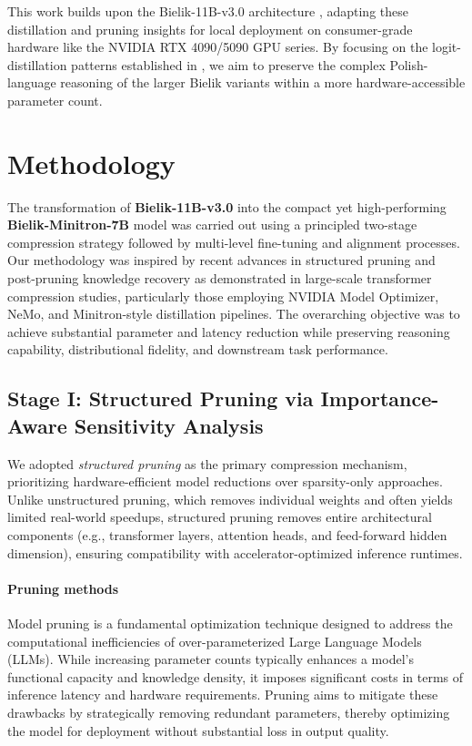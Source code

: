 \documentclass{article}
\begin{document}
This work builds upon the Bielik-11B-v3.0 architecture \cite{ociepa2025bielik11bv3multilingual,ociepa2025bielik11bv2technical,Ociepa_Flis_Wrobel_Gwozdziej_Kinas_2025}, adapting these distillation and pruning insights for local deployment on consumer-grade hardware like the NVIDIA RTX 4090/5090 GPU series. By focusing on the logit-distillation patterns established in \cite{nvidia-developer-blogpost}, we aim to preserve the complex Polish-language reasoning of the larger Bielik variants within a more hardware-accessible parameter count.

\section{Methodology}

The transformation of \textbf{Bielik-11B-v3.0} into the compact yet high-performing \textbf{Bielik-Minitron-7B} model was carried out using a principled two-stage compression strategy followed by multi-level fine-tuning and alignment processes. Our methodology was inspired by recent advances in structured pruning and post-pruning knowledge recovery as demonstrated in large-scale transformer compression studies, particularly those employing NVIDIA Model Optimizer, NeMo, and Minitron-style distillation pipelines. The overarching objective was to achieve substantial parameter and latency reduction while preserving reasoning capability, distributional fidelity, and downstream task performance.

\subsection{Stage I: Structured Pruning via Importance-Aware Sensitivity Analysis}

We adopted \emph{structured pruning} as the primary compression mechanism, prioritizing hardware-efficient model reductions over sparsity-only approaches. Unlike unstructured pruning, which removes individual weights and often yields limited real-world speedups, structured pruning removes entire architectural components (e.g., transformer layers, attention heads, and feed-forward hidden dimension), ensuring compatibility with accelerator-optimized inference runtimes.

\paragraph{Pruning methods}
Model pruning is a fundamental optimization technique designed to address the computational inefficiencies of over-parameterized Large Language Models (LLMs). While increasing parameter counts typically enhances a model's functional capacity and knowledge density, it imposes significant costs in terms of inference latency and hardware requirements. Pruning aims to mitigate these drawbacks by strategically removing redundant parameters, thereby optimizing the model for deployment without substantial loss in output quality.
\end{document}
